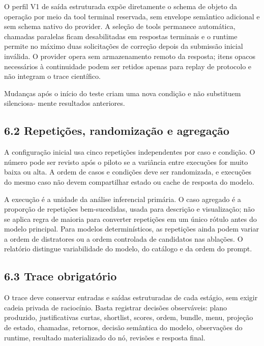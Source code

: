 \documentclass[12pt,a4paper]{article}
\begin{document}
O perfil V1 de saída estruturada expõe diretamente o schema de objeto da operação por meio da tool terminal reservada, sem envelope semântico adicional e sem schema nativo do provider. A seleção de tools permanece automática, chamadas paralelas ficam desabilitadas em respostas terminais e o runtime permite no máximo duas solicitações de correção depois da submissão inicial inválida. O provider opera sem armazenamento remoto da resposta; itens opacos necessários à continuidade podem ser retidos apenas para replay de protocolo e não integram o trace científico.

Mudanças após o início do teste criam uma nova condição e não substituem silenciosa- mente resultados anteriores.


\subsection*{6.2 Repetições, randomização e agregação}

A configuração inicial usa cinco repetições independentes por caso e condição. O número pode ser revisto após o piloto se a variância entre execuções for muito baixa ou alta. A ordem de casos e condições deve ser randomizada, e execuções do mesmo caso não devem compartilhar estado ou cache de resposta do modelo.


A execução é a unidade da análise inferencial primária. O caso agregado é a proporção de repetições bem-sucedidas, usada para descrição e visualização; não se aplica regra de maioria para converter repetições em um único rótulo antes do modelo principal. Para modelos determinísticos, as repetições ainda podem variar a ordem de distratores ou a ordem controlada de candidatos nas ablações. O relatório distingue variabilidade do modelo, do catálogo e da ordem do prompt.


\subsection*{6.3 Trace obrigatório}

O trace deve conservar entradas e saídas estruturadas de cada estágio, sem exigir cadeia privada de raciocínio. Basta registrar decisões observáveis: plano produzido, justificativas curtas, shortlist, scores, ordem, bundle, menu, projeção de estado, chamadas, retornos, decisão semântica do modelo, observações do runtime, resultado materializado do nó, revisões e resposta final.


\end{document}
